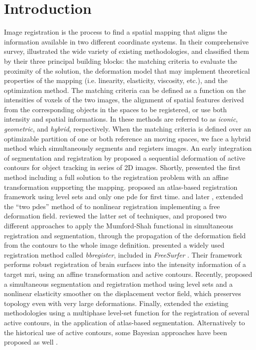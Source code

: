 \section{Introduction}%
\label{sec:introduction}
Image registration is the process to find a spatial mapping that aligns the information available
  in two different coordinate systems.
In their comprehensive survey, \cite{sotiras_deformable_2013} illustrated the wide variety
  of existing methodologies, and classified them by their three principal building blocks:
  the matching criteria to evaluate the proximity of the solution,
  the deformation model that may implement theoretical properties of the mapping
  (i.e. linearity, elasticity, viscosity, etc.), and the optimization method.
The matching criteria can be defined as a function on the intensities of voxels of the
  two images, the alignment of spatial features derived from the corresponding objects in
  the spaces to be registered, or use both intensity and spatial informations.
In \citep{sotiras_deformable_2013} these methods are referred to as \emph{iconic}, \emph{geometric},
  and \emph{hybrid}, respectively.
When the matching criteria is defined over an optimizable partition of one or both reference an
  moving spaces, we face a hybrid method which simultaneously segments and registers images.
An early integration of segmentation and registration by \cite{bertalmio_morphing_2000} proposed
  a sequential deformation of active contours for object tracking in series of 2D images.
Shortly, \cite{yezzi_variational_2003} presented the first method including a full solution to
  the registration problem with an affine transformation supporting the mapping.
\cite{vemuri_joint_2003} proposed an atlas-based registration framework using level sets and only
  one \gls*{pde} for first time.
\cite{unal_coupled_2005} and later \cite{wang_joint_2006},
  extended the ``two \glspl*{pde}'' method of \cite{yezzi_variational_2003}
  to nonlinear registration implementing a free deformation field.
\cite{droske_mumfordshah_2009} reviewed the latter set of techniques, and proposed two different
  approaches to apply the Mumford-Shah functional \citep{mumford_optimal_1989} in simultaneous
  registration and segmentation, through the propagation of the deformation field from
  the contours to the whole image definition.
\cite{greve_accurate_2009} presented a widely used registration method called \emph{bbregister},
  included in \emph{FreeSurfer} \citep{fischl_freesurfer_2012}.
Their framework performs robust registration of brain surfaces into the intensity information
  of a target \gls*{mri}, using an affine transformation and active contours.
Recently, \cite{guyader_combined_2011} proposed a simultaneous segmentation and
  registration method using level sets and a nonlinear elasticity smoother on the
  displacement vector field, which preserves topology even with very large deformations.
Finally, \cite{gorthi_active_2011} extended the existing methodologies using a multiphase
  level-set function for the registration of several active contours, in the application
  of atlas-based segmentation.
Alternatively to the historical use of active contours, some Bayesian approaches
  have been proposed as well \citep{wyatt_map_2003,pohl_bayesian_2006,gass_simultaneous_2014}.

